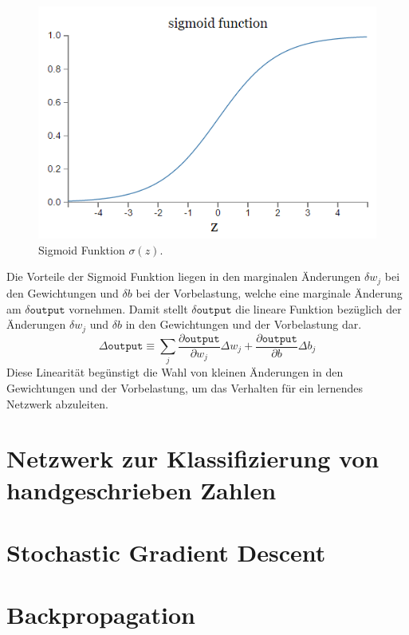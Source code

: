 \begin{figure}[hbt]
	\centering
	\includegraphics[scale=0.6]{Bilder/sigmoid_plot}
	\caption{Sigmoid Funktion $\sigma(z)$.} 
	\label{fig:sigmoid_plot} 
\end{figure}

\noindent
Die Vorteile der Sigmoid Funktion liegen in den marginalen Änderungen $\delta w_j$ bei den Gewichtungen und $\delta b$ bei der Vorbelastung, welche eine marginale Änderung am $\delta\mathtt{output}$ vornehmen. Damit stellt $\delta\mathtt{output}$ die lineare Funktion bezüglich der Änderungen  $\delta w_j$ und $\delta b$ in den Gewichtungen und der Vorbelastung dar.
\begin{equation}
	\Delta\mathtt{output} \equiv \sum_{j}{\frac{\partial\mathtt{output}}{\partial w_j}\Delta w_j+\frac{\partial\mathtt{output}}{\partial b}\Delta b_j}
\end{equation}
Diese Linearität begünstigt die Wahl von kleinen Änderungen in den Gewichtungen und der Vorbelastung, um das Verhalten für ein lernendes Netzwerk abzuleiten.   


\section{Netzwerk zur Klassifizierung von handgeschrieben Zahlen}

\section{Stochastic Gradient Descent}

\section{Backpropagation}
